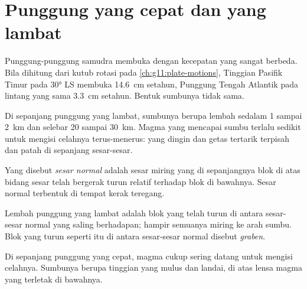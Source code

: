 \section{Punggung yang cepat dan yang lambat}

Punggung-punggung samudra membuka dengan kecepatan yang sangat berbeda. Bila
dihitung dari kutub rotasi pada \cref{ch:g11:plate-motions}, Tinggian Pasifik
Timur pada \ang{30} LS membuka \qty{14.6}{cm} setahun, Punggung Tengah Atlantik
pada lintang yang sama \qty{3.3}{cm} setahun. Bentuk sumbunya tidak sama.

Di sepanjang punggung yang lambat, sumbunya berupa lembah sedalam 1 sampai
\qty{2}{km} dan selebar 20 sampai \qty{30}{km}. Magma yang mencapai sumbu terlalu
sedikit untuk mengisi celahnya terus-menerus:  yang dingin dan getas
tertarik terpisah dan patah di sepanjang sesar-sesar.

\begin{definition}\label{def:g11:ocean-ridges:normal-fault}
Yang disebut \emph{sesar normal} adalah sesar miring yang di
sepanjangnya blok di atas bidang sesar telah bergerak turun relatif terhadap blok
di bawahnya. Sesar normal terbentuk di tempat kerak teregang.
\end{definition}

Lembah punggung yang lambat adalah blok yang telah turun di antara sesar-sesar
normal yang saling berhadapan; hampir semuanya miring ke arah sumbu. Blok yang
turun seperti itu di antara sesar-sesar normal disebut \emph{graben}.

Di sepanjang punggung yang cepat, magma cukup sering datang untuk mengisi
celahnya. Sumbunya berupa tinggian yang mulus dan landai, di atas lensa magma
yang terletak di bawahnya.

